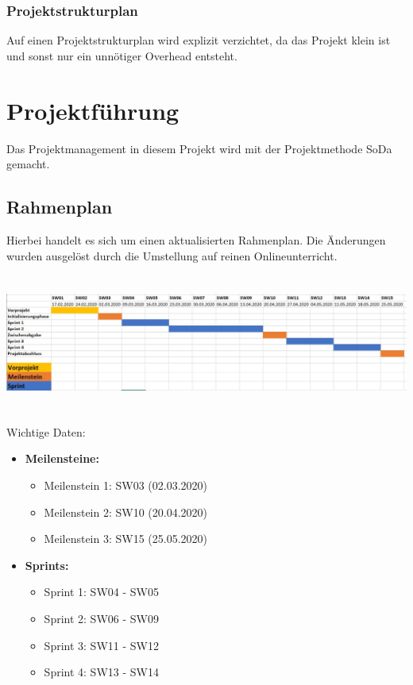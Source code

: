 \documentclass[11pt]{article}
\begin{document}
\subsubsection{Projektstrukturplan}
Auf einen Projektstrukturplan wird explizit verzichtet, da das Projekt klein ist und sonst nur ein unnötiger Overhead entsteht.


\section{Projektführung}
Das Projektmanagement in diesem Projekt wird mit der Projektmethode SoDa gemacht.
\subsection{Rahmenplan}
Hierbei handelt es sich um einen aktualisierten Rahmenplan. Die Änderungen wurden ausgelöst durch die Umstellung auf reinen Onlineunterricht.



\begin{center}
	\includegraphics[height=4.5cm,keepaspectratio]{images/Projektrahmenplan_2V.JPG}
\end{center}
Wichtige Daten:
\begin{itemize}
	\itemsep0pt
	\item \textbf{Meilensteine: }
	\begin{itemize}
		\itemsep0pt
		\item Meilenstein 1: SW03 (02.03.2020)
		\item Meilenstein 2: SW10 (20.04.2020)
		\item Meilenstein 3: SW15 (25.05.2020)
	\end{itemize}
	
	\item \textbf{Sprints: }
		\begin{itemize}
		\itemsep0pt
		\item Sprint 1: SW04 - SW05
		\item Sprint 2: SW06 - SW09
		\item Sprint 3: SW11 - SW12
		\item Sprint 4: SW13 - SW14
	\end{itemize}
\end{itemize}
\end{document}
